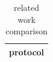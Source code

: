 \begin{table}[h]
\centering
\begin{tabular}{|c|}
\hline
protocol \\ \hline
\hline
\end{tabular}
\caption{related work comparison}
\label{tab:T12}
\end{table}
